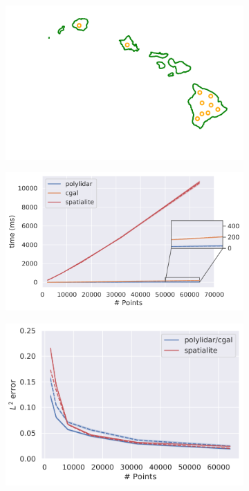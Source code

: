 \begin{figure}[ht]
\begin{subfigure}[t]{.33\linewidth}
    \caption{}
    \label{fig:ch2_ca_acc}
  \end{subfigure}
  \begin{subfigure}[t]{.28\linewidth}
    \centering
    \includegraphics[clip, trim=1.5cm 0cm 1.0cm 0cm, width=0.99\linewidth]{chapter_2_polylidar/imgs/hiholes.pdf}
    \caption{}
    \label{fig:ch2_hi_holes}
  \end{subfigure}
  \begin{subfigure}[t]{.36\linewidth}
    \centering
     \includegraphics[width=.99\linewidth]{chapter_2_polylidar/imgs/compare_algs_time_inset_hi.pdf}
    \caption{}
    \label{fig:ch2_hi_tim}
  \end{subfigure}
  \begin{subfigure}[t]{.33\linewidth}
    \centering
    \includegraphics[width=.99\linewidth]{chapter_2_polylidar/imgs/compare_algs_accuracy_hi-min.pdf}

\end{subfigure}
\end{figure}
